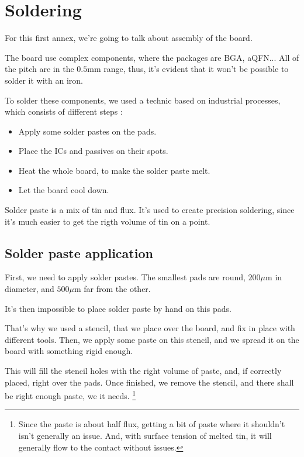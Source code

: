 \section{Soldering}\label{sec:assembly}
For this first annex, we're going to talk about assembly of the board.

The board use complex components, where the packages are BGA, aQFN... All of
the pitch are in the $0.5 \si{\milli\meter}$ range, thus, it's evident that it
won't be possible to solder it with an iron.

To solder these components, we used a technic based on industrial processes,
which consists of different steps :

\begin{itemize}
    \item   Apply some solder pastes on the pads.
    \item   Place the ICs and passives on their spots.
    \item   Heat the whole board, to make the solder paste melt.
    \item   Let the board cool down.
\end{itemize}

Solder paste is a mix of tin and flux. It's used to create precision soldering,
since it's much easier to get the rigth volume of tin on a point.

\subsection{Solder paste application}
First, we need to apply solder pastes. The smallest pads are round, $200
    \si{\mu\meter}$ in diameter, and $500 \si{\mu\meter}$ far from the other.

It's then impossible to place solder paste by hand on this pads.

That's why we used a stencil, that we place over the board, and fix in place
with different tools. Then, we apply some paste on this stencil, and we spread
it on the board with something rigid enough.

This will fill the stencil holes with the right volume of paste, and, if
correctly placed, right over the pads. Once finished, we remove the stencil,
and there shall be right enough paste, we it needs. \footnote{ Since the paste
    is about half flux, getting a bit of paste where it shouldn't isn't generally
    an issue. And, with surface tension of melted tin, it will generally flow to
    the contact without issues. }

